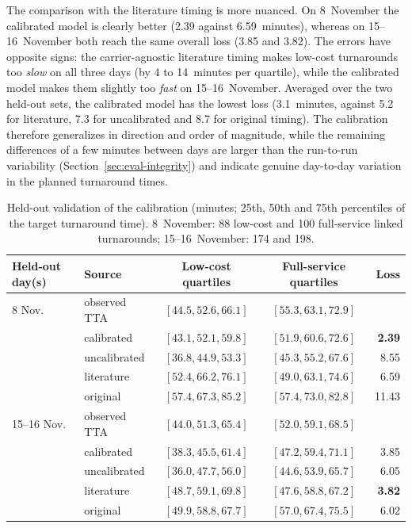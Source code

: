 The comparison with the literature timing is more nuanced. On 8~November the calibrated model is clearly better (2.39 against 6.59~minutes), whereas on 15--16~November both reach the same overall loss (3.85 and 3.82). The errors have opposite signs: the carrier-agnostic literature timing makes low-cost turnarounds too \emph{slow} on all three days (by 4 to 14~minutes per quartile), while the calibrated model makes them slightly too \emph{fast} on 15--16~November. Averaged over the two held-out sets, the calibrated model has the lowest loss (3.1~minutes, against 5.2 for literature, 7.3 for uncalibrated and 8.7 for original timing). The calibration therefore generalizes in direction and order of magnitude, while the remaining differences of a few minutes between days are larger than the run-to-run variability (Section~\ref{sec:eval-integrity}) and indicate genuine day-to-day variation in the planned turnaround times.

\begin{table}[htbp]\centering\small
\begin{tabular}{llccr}\hline
Held-out day(s) & Source & Low-cost quartiles & Full-service quartiles & Loss\\\hline
8 Nov. & observed TTA & $[44.5, 52.6, 66.1]$ & $[55.3, 63.1, 72.9]$ & \\
 & calibrated & $[43.1, 52.1, 59.8]$ & $[51.9, 60.6, 72.6]$ & \textbf{2.39}\\
 & uncalibrated & $[36.8, 44.9, 53.3]$ & $[45.3, 55.2, 67.6]$ & 8.55\\
 & literature & $[52.4, 66.2, 76.1]$ & $[49.0, 63.1, 74.6]$ & 6.59\\
 & original & $[57.4, 67.3, 85.2]$ & $[57.4, 73.0, 82.8]$ & 11.43\\\hline
15--16 Nov. & observed TTA & $[44.0, 51.3, 65.4]$ & $[52.0, 59.1, 68.5]$ & \\
 & calibrated & $[38.3, 45.5, 61.4]$ & $[47.2, 59.4, 71.1]$ & 3.85\\
 & uncalibrated & $[36.0, 47.7, 56.0]$ & $[44.6, 53.9, 65.7]$ & 6.05\\
 & literature & $[48.7, 59.1, 69.8]$ & $[47.6, 58.8, 67.2]$ & \textbf{3.82}\\
 & original & $[49.9, 58.8, 67.7]$ & $[57.0, 67.4, 75.5]$ & 6.02\\\hline
\end{tabular}
\caption{Held-out validation of the calibration (minutes; 25th, 50th and 75th percentiles of the target turnaround time). 8~November: 88 low-cost and 100 full-service linked turnarounds; 15--16~November: 174 and 198.}
\label{tab:calibration}
\end{table}

